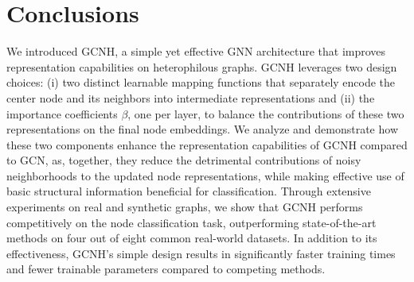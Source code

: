 \documentclass[conference]{IEEEtran}
\begin{document}
\section{Conclusions}
We introduced GCNH, a simple yet effective GNN architecture that improves representation capabilities on heterophilous graphs. 
GCNH leverages two design choices: (i) two distinct learnable mapping functions that separately encode the center node and its neighbors into intermediate representations and (ii) the importance coefficients $\beta$, one per layer, to balance the contributions of these two representations on the final node embeddings.
We analyze and demonstrate how these two components enhance the representation capabilities of GCNH compared to GCN, as, together, they reduce the detrimental contributions of noisy neighborhoods to the updated node representations, while making effective use of basic structural information beneficial for classification. 
Through extensive experiments on real and synthetic graphs, we show that GCNH performs competitively on the node classification task, outperforming state-of-the-art methods on four out of eight common real-world datasets.  
In addition to its effectiveness, GCNH's simple design results in significantly faster training times and fewer trainable parameters compared to competing methods.
\end{document}

